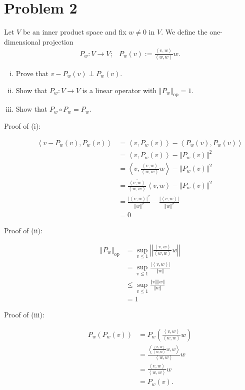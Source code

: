 \documentclass[9pt]{extarticle}
\newcommand{\iprod}[2]{\left\langle #1,#2\right\rangle}
\newcommand{\norm}[1]{\left\Vert #1\right\Vert}
\begin{document}
  \section{Problem 2}%
  Let $V$ be an inner product space and fix $w\neq 0$ in $V$. We define the one-dimensional projection
  \begin{align*}
    P_w: V\rightarrow V;&P_w(v) := \frac{\iprod{v}{w}}{\iprod{w}{w}}w.
  \end{align*}
  \begin{enumerate}[(i)]
    \item Prove that $v-P_w(v)\perp P_w(v)$.
    \item Show that $P_w:V\rightarrow V$ is a linear operator with $\norm{P_w}_{\text{op}} = 1$.
    \item Show that $P_w\circ P_w = P_w$.
  \end{enumerate}
  \begin{description}
    \item[Proof of (i):]
      \begin{align*}
        \iprod{v-P_w(v)}{P_w(v)} &= \iprod{v}{P_w(v)} - \iprod{P_w(v)}{P_w(v)}\\
                                 &= \iprod{v}{P_w(v)} - \norm{P_w(v)}^2\\
                                 &= \iprod{v}{\frac{\iprod{v}{w}}{\iprod{w}{w}}w} - \norm{P_w(v)}^2\\
                                 &= \frac{\overline{\iprod{v}{w}}}{\iprod{w}{w}}\iprod{v}{w} - \norm{P_w(v)}^2\\
                                 &= \frac{|\iprod{v}{w}|^2}{\norm{w}^2} - \frac{|\iprod{v}{w}|}{\norm{w}^2}\\
                                 &= 0
      \end{align*}
    \item[Proof of (ii):]
      \begin{align*}
        \norm{P_w}_{\text{op}} &= \sup_{v\leq 1} \norm{\frac{\iprod{v}{w}}{\iprod{w}{w}}w}\\
                               &= \sup_{v\leq 1} \frac{|\iprod{v}{w}|}{\norm{w}}\\
                               &\leq \sup_{v\leq 1}\frac{\norm{v}{\norm{w}}}{\norm{w}}\\
                               &= 1
      \end{align*}
    \item[Proof of (iii):]
      \begin{align*}
        P_w(P_w(v)) &= P_w\left(\frac{\iprod{v}{w}}{\iprod{w}{w}} w\right)\\
                    &= \frac{\iprod{\frac{\iprod{v}{w}}{\iprod{w}{w}}w}{w}}{\iprod{w}{w}}w\\
                    &= \frac{\iprod{v}{w}}{\iprod{w}{w}}w\\
                    &= P_w(v).
      \end{align*}
  \end{description}
\end{document}
